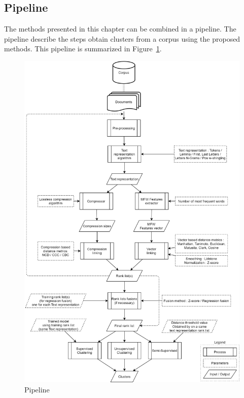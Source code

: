 \subsection{Pipeline}

The methods presented in this chapter can be combined in a pipeline.
The pipeline describe the steps obtain clusters from a corpus using the proposed methods.
This pipeline is summarized in Figure~\ref{fig:pipeline}.

\onecolumn
\begin{figure}[p]
  \centering
  \caption{Pipeline}
  \label{fig:pipeline}
  \includegraphics[width=\textwidth,height=\textheight,keepaspectratio]{img/pipeline.png}
\end{figure}
\twocolumn
